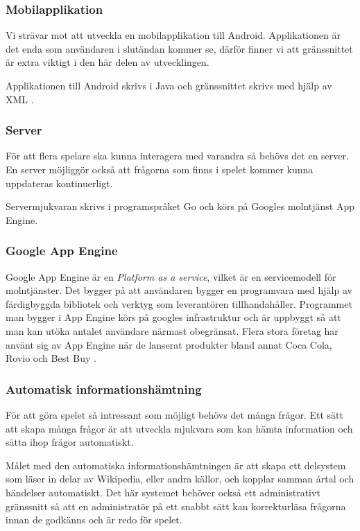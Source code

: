 \documentclass[a4paper, 11pt]{article}
\begin{document}
\subsubsection{Mobilapplikation}
Vi strävar mot att utveckla en mobilapplikation till Android. Applikationen är det enda som användaren i slutändan kommer se, därför finner vi att gränssnittet är extra viktigt i den här delen av utvecklingen. 

Applikationen till Android skrivs i Java och gränssnittet skrivs med hjälp av XML \cite{xml}. 

\subsubsection{Server}
För att flera spelare ska kunna interagera med varandra så behövs det en server. En server möjliggör också att frågorna som finns i spelet kommer kunna uppdateras kontinuerligt.

Servermjukvaran skrivs i programspråket Go \cite{golang} och körs på Googles molntjänst App Engine.

\subsubsection{Google App Engine} 
Google App Engine är en \textit{Platform as a service}, vilket är en servicemodell för molntjänster. Det bygger på att användaren bygger en programvara med hjälp av färdigbyggda bibliotek och verktyg som leverantören tillhandahåller. Programmet man bygger i App Engine körs på googles infrastruktur och är uppbyggt så att man kan utöka antalet användare närmast obegränsat. Flera stora företag har använt sig av App Engine när de lanserat produkter bland annat Coca Cola, Rovio och Best Buy \cite{googleappenginecustomers}. 

\subsubsection{Automatisk informationshämtning}
För att göra spelet så intressant som möjligt behövs det många frågor. Ett sätt att skapa många frågor är att utveckla mjukvara som kan hämta information och sätta ihop frågor automatiskt. 

Målet med den automatiska informationshämtningen är att skapa ett delsystem som läser in delar av Wikipedia, eller andra källor, och kopplar samman årtal och händelser automatiskt. Det här systemet behöver också ett administrativt gränssnitt så att en administratör på ett snabbt sätt kan korrekturläsa frågorna innan de godkänns och är redo för spelet.
\end{document}
